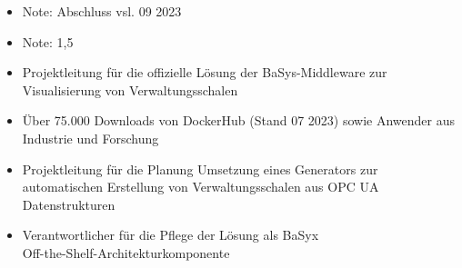 \documentclass[10pt,a4paper,ragged2e,withhyper]{altacv}
\begin{document}
\begin{paracol}{2}
            \begin{itemize}
                \item Note: Abschluss vsl. 09 2023
            \end{itemize}
            \divider
            
            \begin{itemize}
                \item Note: 1,5
            \end{itemize}
        
            \begin{itemize}
                \item Projektleitung für die offizielle Lösung der BaSys-Middleware zur Visualisierung von Verwaltungsschalen
                \item Über 75.000 Downloads von DockerHub (Stand 07 2023) sowie Anwender aus Industrie und Forschung
            \end{itemize}
            \divider
            
            \begin{itemize}
                \item Projektleitung für die Planung Umsetzung eines Generators zur automatischen Erstellung von Verwaltungsschalen aus OPC UA Datenstrukturen
                \item Verantwortlicher für die Pflege der Lösung als BaSyx\\ Off-the-Shelf-Architekturkomponente
            \end{itemize}


\end{paracol}
\end{document}
